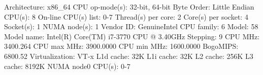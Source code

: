 \documentclass[a4paper]{article}
\begin{document}
\begin{verbnobox}[\footnotesize]
Architecture:        x86_64
CPU op-mode(s):      32-bit, 64-bit
Byte Order:          Little Endian
CPU(s):              8
On-line CPU(s) list: 0-7
Thread(s) per core:  2
Core(s) per socket:  4
Socket(s):           1
NUMA node(s):        1
Vendor ID:           GenuineIntel
CPU family:          6
Model:               58
Model name:          Intel(R) Core(TM) i7-3770 CPU @ 3.40GHz
Stepping:            9
CPU MHz:             3400.264
CPU max MHz:         3900.0000
CPU min MHz:         1600.0000
BogoMIPS:            6800.52
Virtualization:      VT-x
L1d cache:           32K
L1i cache:           32K
L2 cache:            256K
L3 cache:            8192K
NUMA node0 CPU(s):   0-7
\end{verbnobox}
\end{document}
